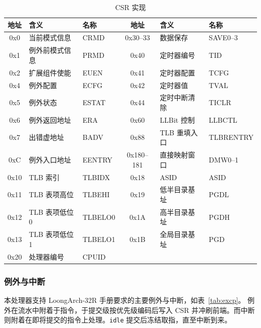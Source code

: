 \begin{table}[H]
\centering
\caption{CSR 实现}
\label{tab:csr}
\small
\begin{tabular}{cll|cll}
\toprule
地址 & 含义 & 名称 & 地址 & 含义 & 名称 \\
\midrule
0x0 & 当前模式信息 & CRMD & 0x30--33 & 数据保存 & SAVE0--3 \\
0x1 & 例外前模式信息 & PRMD & 0x40 & 定时器编号 & TID \\
0x2 & 扩展组件使能 & EUEN & 0x41 & 定时器配置 & TCFG \\
0x4 & 例外配置 & ECFG & 0x42 & 定时器值 & TVAL \\
0x5 & 例外状态 & ESTAT & 0x44 & 定时中断清除 & TICLR \\
0x6 & 例外返回地址 & ERA & 0x60 & LLBit 控制 & LLBCTL \\
0x7 & 出错虚地址 & BADV & 0x88 & TLB 重填入口 & TLBRENTRY \\
0xC & 例外入口地址 & EENTRY & 0x180--181 & 直接映射窗口 & DMW0--1 \\
0x10 & TLB 索引 & TLBIDX & 0x18 & ASID & ASID \\
0x11 & TLB 表项高位 & TLBEHI & 0x19 & 低半目录基址 & PGDL \\
0x12 & TLB 表项低位 0 & TLBELO0 & 0x1A & 高半目录基址 & PGDH \\
0x13 & TLB 表项低位 1 & TLBELO1 & 0x1B & 全局目录基址 & PGD \\
0x20 & 处理器编号 & CPUID & & & \\
\bottomrule
\end{tabular}
\end{table}

\subsubsection{例外与中断}

本处理器支持 LoongArch-32R 手册要求的主要例外与中断，如表~\ref{tab:excp}。
例外在流水中附着于指令，于提交级按优先级编码后写入 CSR 并冲刷前端。而中断则附着在即将提交的指令上处理。\texttt{idle} 提交后冻结取指，直至中断到来。


